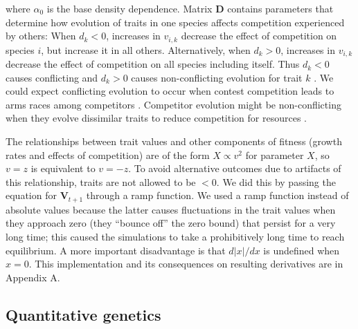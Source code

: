 \noindent where $\alpha_0$ is the base density dependence.
Matrix $\mathbf{D}$ contains parameters that determine how evolution of traits
in one species affects competition experienced by others:
When $d_k < 0$, increases in $v_{i,k}$ decrease the
effect of competition on species $i$, but increase it in all others.
Alternatively, when $d_k > 0$, increases in $v_{i,k}$ decrease the effect of
competition on all species including itself.
Thus $d_k < 0$ causes conflicting and $d_k > 0$ causes non-conflicting evolution
for trait $k$ \citep{Northfield:2013if}.
We could expect conflicting evolution to occur when contest competition
leads to arms races among competitors
\citep{Abrams:1994th}.
Competitor evolution might be non-conflicting when they evolve
dissimilar traits to reduce competition for resources \citep{Roughgarden:1976eh}.


The relationships between trait values and other components of fitness
(growth rates and effects of competition) are of the form
$X \propto v^2$ for parameter $X$, so $v = z$ is equivalent to $v = -z$.
To avoid alternative outcomes due to artifacts of this relationship,
traits are not allowed to be $< 0$.
We did this by passing the equation for $\mathbf{V}_{t+1}$ through a
ramp function.
We used a ramp function instead of absolute values
because the latter causes fluctuations
in the trait values when they approach zero (they ``bounce off''
the zero bound) that persist for a very long time;
this caused the simulations to take a prohibitively long time to reach
equilibrium.
A more important disadvantage is that $d \lvert x \rvert / dx$ is
undefined when $x = 0$.
This implementation and its consequences on resulting derivatives are in
Appendix A.




%


\subsection*{Quantitative genetics}

